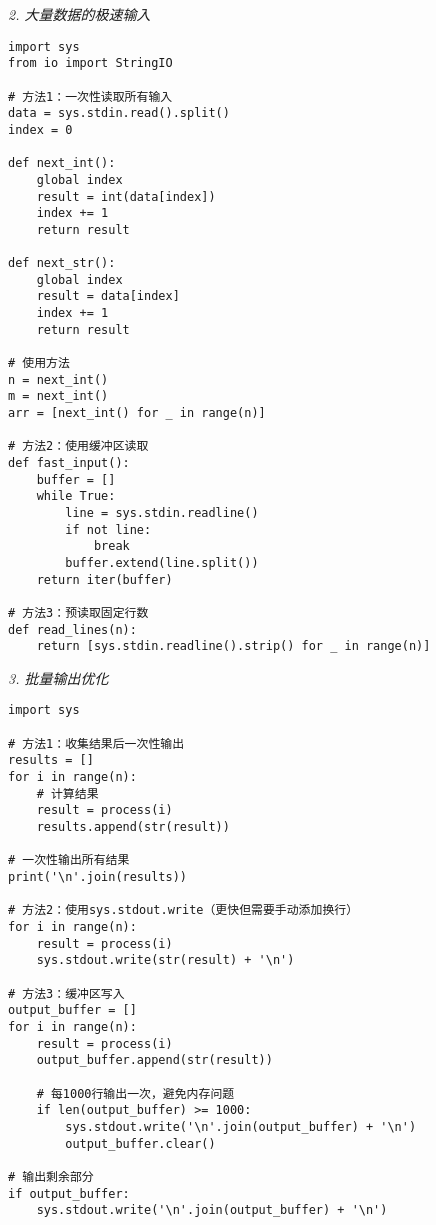 \documentclass[a4paper,9pt,twocolumn]{ctexart}
\begin{document}
\textit{2. 大量数据的极速输入}
\begin{verbatim}
import sys
from io import StringIO

# 方法1：一次性读取所有输入
data = sys.stdin.read().split()
index = 0

def next_int():
    global index
    result = int(data[index])
    index += 1
    return result

def next_str():
    global index
    result = data[index]
    index += 1
    return result

# 使用方法
n = next_int()
m = next_int()
arr = [next_int() for _ in range(n)]

# 方法2：使用缓冲区读取
def fast_input():
    buffer = []
    while True:
        line = sys.stdin.readline()
        if not line:
            break
        buffer.extend(line.split())
    return iter(buffer)

# 方法3：预读取固定行数
def read_lines(n):
    return [sys.stdin.readline().strip() for _ in range(n)]
\end{verbatim}

\textit{3. 批量输出优化}
\begin{verbatim}
import sys

# 方法1：收集结果后一次性输出
results = []
for i in range(n):
    # 计算结果
    result = process(i)
    results.append(str(result))

# 一次性输出所有结果
print('\n'.join(results))

# 方法2：使用sys.stdout.write（更快但需要手动添加换行）
for i in range(n):
    result = process(i)
    sys.stdout.write(str(result) + '\n')

# 方法3：缓冲区写入
output_buffer = []
for i in range(n):
    result = process(i)
    output_buffer.append(str(result))
    
    # 每1000行输出一次，避免内存问题
    if len(output_buffer) >= 1000:
        sys.stdout.write('\n'.join(output_buffer) + '\n')
        output_buffer.clear()

# 输出剩余部分
if output_buffer:
    sys.stdout.write('\n'.join(output_buffer) + '\n')
\end{verbatim}
\end{document}
